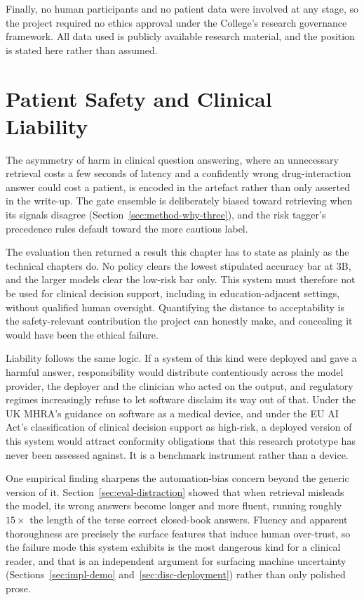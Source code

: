 Finally, no human participants and no patient data were involved at any stage,
so the project required no ethics approval under the College's research
governance framework. All data used is publicly available research material,
and the position is stated here rather than assumed.

\section{Patient Safety and Clinical Liability}
\label{sec:lsep-safety}

The asymmetry of harm in clinical question answering, where an unnecessary
retrieval costs a few seconds of latency and a confidently wrong
drug-interaction answer could cost a patient, is encoded in the artefact
rather than only asserted in the write-up. The gate ensemble is deliberately
biased toward retrieving when its signals disagree
(Section~\ref{sec:method-why-three}), and the risk tagger's precedence rules
default toward the more cautious label.

The evaluation then returned a result this chapter has to state as plainly as
the technical chapters do. No policy clears the lowest stipulated accuracy bar
at 3B, and the larger models clear the low-risk bar only. This system must
therefore not be used for clinical decision support, including in
education-adjacent settings, without qualified human oversight. Quantifying
the distance to acceptability is the safety-relevant contribution the project
can honestly make, and concealing it would have been the ethical failure.

Liability follows the same logic. If a system of this kind were deployed and
gave a harmful answer, responsibility would distribute contentiously across
the model provider, the deployer and the clinician who acted on the output,
and regulatory regimes increasingly refuse to let software disclaim its way
out of that. Under the UK MHRA's guidance on software as a medical device, and
under the EU AI Act's classification of clinical decision support as
high-risk, a deployed version of this system would attract conformity
obligations that this research prototype has never been assessed against. It
is a benchmark instrument rather than a device.

One empirical finding sharpens the automation-bias concern beyond the generic
version of it. Section~\ref{sec:eval-distraction} showed that when retrieval
misleads the model, its wrong answers become longer and more fluent, running
roughly $15\times$ the length of the terse correct closed-book answers.
Fluency and apparent thoroughness are precisely the surface features that
induce human over-trust, so the failure mode this system exhibits is the most
dangerous kind for a clinical reader, and that is an independent argument for
surfacing machine uncertainty (Sections~\ref{sec:impl-demo}
and~\ref{sec:disc-deployment}) rather than only polished prose.


